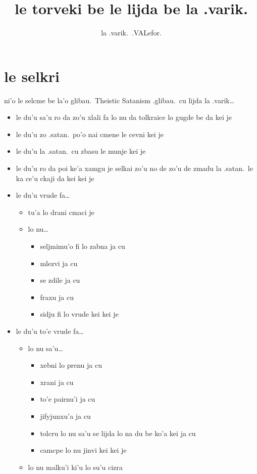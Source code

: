 \documentclass{article}
\title{le torveki be le lijda be la .varik.}
\author{la .varik.\ .VALefor.}
\begin{document}
\maketitle

\section{le selkri}

ni'o le selcme be la'o glibau.\ Theistic Satanism .glibau.\ cu lijda la .varik\ldots

\begin{itemize}
	\item le du'u sa'u ro da zo'u xlali fa lo nu da tolkraice lo gugde be da kei je
	\item le du'u zo .satan.\ po'o nai cmene le cevni kei je
	\item le du'u la .satan.\ cu zbasu le munje kei je
	\item le du'u ro da poi ke'a xamgu je selkai zo'u no de zo'u de zmadu la .satan.\ le ka ce'u ckaji da kei kei je
	\item le du'u vrude fa\ldots{}
	\begin{itemize}
		\item tu'a lo drani cmaci je
		\item lo nu\ldots{}
		\begin{itemize}
			\item seljmimu'o fi lo zabna ja cu
			\item mlezvi ja cu
			\item se zdile ja cu
			\item fraxu ja cu
			\item sidju fi lo vrude kei kei je
		\end{itemize}
	\end{itemize}
	\item le du'u to'e vrude fa\ldots{}
	\begin{itemize}
		\item lo nu sa'u\ldots{}
		\begin{itemize}
			\item xebni lo prenu ja cu
			\item xrani ja cu
			\item to'e pairnu'i ja cu
			\item jifyjunxu'a ja cu
			\item tolcru lo nu sa'u se lijda lo na du be ko'a kei ja cu
			\item camcpe lo nu jinvi kei kei je
		\end{itemize}
		\item lo nu malku'i ki'u lo su'u cizra
	\end{itemize}
\end{itemize}
\end{document}
